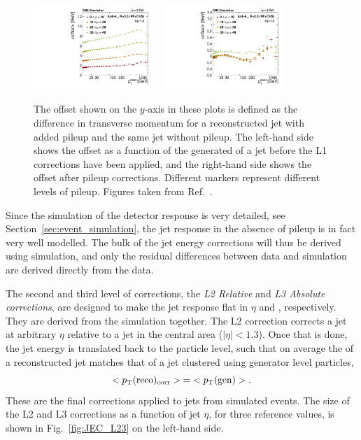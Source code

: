 \begin{figure}[p]
  \centering
  \includegraphics[width=0.4\textwidth]{figures/eventreco_objects/OffMeantnpuRef_BB_ak5pfchs}
  ~
  \includegraphics[width=0.4\textwidth]{figures/eventreco_objects/OffMeantnpuRef_BB_ak5pfchsl1}
  \caption{The offset shown on the $y$-axis in these plots is defined as the difference in
transverse momentum for a reconstructed jet with added pileup and the same jet without pileup.
The left-hand side shows the offset as a function of the generated \pt of a jet before the L1
corrections have been applied, and the right-hand side shows the offset after pileup
corrections. Different markers represent different levels of pileup. Figures taken from
Ref.~\cite{JEC_plots}.
  \label{fig:JEC_L1}}
\end{figure}

Since the simulation of the detector response is very detailed, see
Section~\ref{sec:event_simulation}, the jet response in the absence of pileup is in fact very well
modelled. The bulk of the jet energy corrections will thus be derived using
simulation, and only the residual differences between data and simulation are derived directly
from the data.

The second and third level of corrections, the \textit{L2 Relative} and \textit{L3 Absolute
corrections}, are designed to make the jet response flat in $\eta$ and \pt, respectively. They are
derived from the simulation together. The L2 correction corrects a jet at arbitrary $\eta$ relative
to a jet in the central area ($|\eta|<1.3$). Once that is done, the jet energy is translated back to
the particle level, such that on average the \pt of a reconstructed jet matches that of a jet
clustered using generator level particles,
\begin{equation}
  <p_{\mathrm{T}}(\mathrm{reco})_{\mathrm{corr}}> {=} <p_{\mathrm{T}}(\mathrm{gen})> .
\end{equation}
These are the final corrections applied to jets from simulated events. The size of the L2 and L3
corrections as a function of jet $\eta$, for three reference \pt values, is shown in
Fig.~\ref{fig:JEC_L23} on the left-hand side. 

